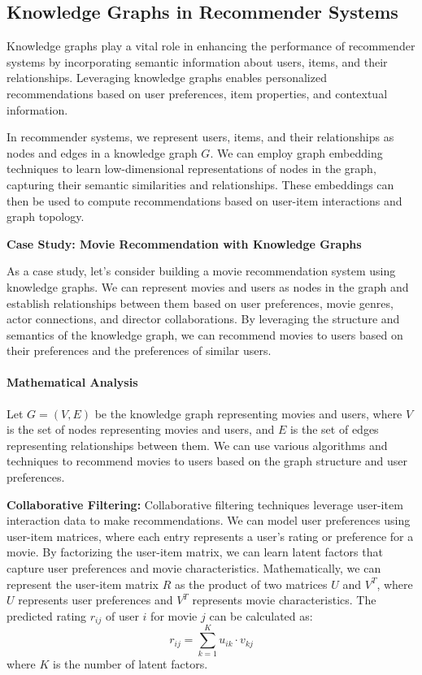 \documentclass[12pt]{book} %
\begin{document}
\subsection{Knowledge Graphs in Recommender Systems}

Knowledge graphs play a vital role in enhancing the performance of recommender systems by incorporating semantic information about users, items, and their relationships. Leveraging knowledge graphs enables personalized recommendations based on user preferences, item properties, and contextual information.

In recommender systems, we represent users, items, and their relationships as nodes and edges in a knowledge graph \(G\). We can employ graph embedding techniques to learn low-dimensional representations of nodes in the graph, capturing their semantic similarities and relationships. These embeddings can then be used to compute recommendations based on user-item interactions and graph topology.

\textbf{Case Study: Movie Recommendation with Knowledge Graphs}

As a case study, let's consider building a movie recommendation system using knowledge graphs. We can represent movies and users as nodes in the graph and establish relationships between them based on user preferences, movie genres, actor connections, and director collaborations. By leveraging the structure and semantics of the knowledge graph, we can recommend movies to users based on their preferences and the preferences of similar users.

\paragraph{Mathematical Analysis}

Let \(G = (V, E)\) be the knowledge graph representing movies and users, where \(V\) is the set of nodes representing movies and users, and \(E\) is the set of edges representing relationships between them. We can use various algorithms and techniques to recommend movies to users based on the graph structure and user preferences.

\textbf{Collaborative Filtering:} Collaborative filtering techniques leverage user-item interaction data to make recommendations. We can model user preferences using user-item matrices, where each entry represents a user's rating or preference for a movie. By factorizing the user-item matrix, we can learn latent factors that capture user preferences and movie characteristics. Mathematically, we can represent the user-item matrix \(R\) as the product of two matrices \(U\) and \(V^T\), where \(U\) represents user preferences and \(V^T\) represents movie characteristics. The predicted rating \(r_{ij}\) of user \(i\) for movie \(j\) can be calculated as:
\[ r_{ij} = \sum_{k=1}^{K} u_{ik} \cdot v_{kj} \]
where \(K\) is the number of latent factors.
\end{document}
